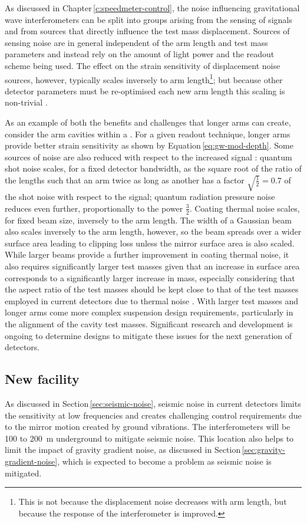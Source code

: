 As discussed in Chapter\,\ref{c:speedmeter-control}, the noise influencing gravitational wave interferometers can be split into groups arising from the sensing of signals and from sources that directly influence the test mass displacement. Sources of sensing noise are in general independent of the arm length and test mass parameters and instead rely on the amount of light power and the readout scheme being used. The effect on the strain sensitivity of displacement noise sources, however, typically scales inversely to arm length\footnote{This is not because the displacement noise decreases with arm length, but because the response of the interferometer is improved.}; but because other detector parameters must be re-optimised each new arm length this scaling is non-trivial \cite{Dwyer2015}.

As an example of both the benefits and challenges that longer arms can create, consider the arm cavities within a \FPMI{}. For a given readout technique, longer arms provide better strain sensitivity as shown by Equation\,\ref{eq:gw-mod-depth}. Some sources of noise are also reduced with respect to the increased signal \cite{aligocosmic2016}: quantum shot noise scales, for a fixed detector bandwidth, as the square root of the ratio of the lengths such that an arm twice as long as another has a factor $\sqrt{\frac{1}{2}} = 0.7$ of the shot noise with respect to the signal; quantum radiation pressure noise reduces even further, proportionally to the power $\frac{3}{2}$. Coating thermal noise scales, for fixed beam size, inversely to the arm length. The width of a Gaussian beam also scales inversely to the arm length, however, so the beam spreads over a wider surface area leading to clipping loss unless the mirror surface area is also scaled. While larger beams provide a further improvement in coating thermal noise, it also requires significantly larger test masses given that an increase in surface area corresponds to a significantly larger increase in mass, especially considering that the aspect ratio of the test masses should be kept close to that of the test masses employed in current detectors due to thermal noise \cite{Somiya2009a}. With larger test masses and longer arms come more complex suspension design requirements, particularly in the alignment of the cavity test masses. Significant research and development is ongoing to determine designs to mitigate these issues for the next generation of detectors.

\subsection{New facility}
As discussed in Section\,\ref{sec:seismic-noise}, seismic noise in current detectors limits the sensitivity at low frequencies and creates challenging control requirements due to the mirror motion created by ground vibrations. The \ET{} interferometers will be \num{100} to \SI{200}{\meter} underground to mitigate seismic noise. This location also helps to limit the impact of gravity gradient noise, as discussed in Section\,\ref{sec:gravity-gradient-noise}, which is expected to become a problem as seismic noise is mitigated.

